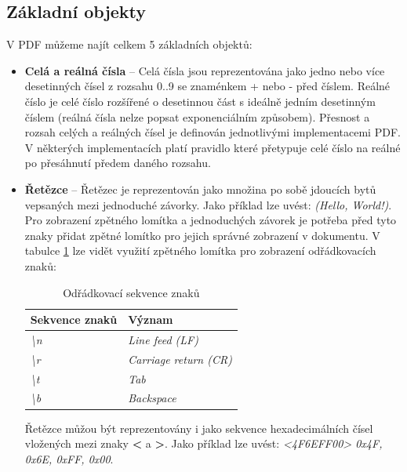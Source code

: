 \subsection{Základní objekty}
V PDF můžeme najít celkem 5 základních objektů:
	\begin{itemize}
		\item \textbf{Celá a reálná čísla} -- Celá čísla jsou reprezentována jako jedno nebo více desetinných čísel z rozsahu 0..9 se znaménkem + nebo - před číslem. Reálné číslo je celé číslo rozšířené o desetinnou část s ideálně jedním desetinným číslem (reálná čísla nelze popsat exponenciálním způsobem). Přesnost a rozsah celých a reálných čísel je definován jednotlivými implementacemi PDF. V některých implementacích platí pravidlo které přetypuje celé číslo na reálné po přesáhnutí předem daného rozsahu.
		\item \textbf{Řetězce} -- Řetězec je reprezentován jako množina po sobě jdoucích bytů vepsaných mezi jednoduché závorky. Jako příklad lze uvést: \textit{(Hello, World!)}. Pro zobrazení zpětného lomítka a jednoduchých závorek je potřeba před tyto znaky přidat zpětné lomítko pro jejich správné zobrazení v dokumentu. V tabulce \ref{tab:table_escaped} lze vidět využití zpětného lomítka pro zobrazení odřádkovacích znaků:
			\begin{table}[h!]
			\centering
			\begin{tabular}{|l|l|} 
			\hline
			\textbf{Sekvence znaků}    & \textbf{Význam}                \\ 
			\hline
			\textit{\textbackslash{}n} & \textit{Line feed (LF)}        \\ 
			\hline
			\textit{\textbackslash{}r} & \textit{Carriage return (CR)}  \\ 
			\hline
			\textit{\textbackslash{}t} & \textit{Tab}                   \\ 
			\hline
			\textit{\textbackslash{}b} & \textit{Backspace}                      \\
			\hline
			\end{tabular}
			\caption{Odřádkovací sekvence znaků}
			\label{tab:table_escaped}
			\end{table}
		\newline Řetězce můžou být reprezentovány i jako sekvence hexadecimálních čísel vložených mezi znaky \textbf{<} a \textbf{>}. 
		\newline Jako příklad lze uvést: \textit{<4F6EFF00> \textrightarrow 0x4F, 0x6E, 0xFF, 0x00}.


\end{itemize}
